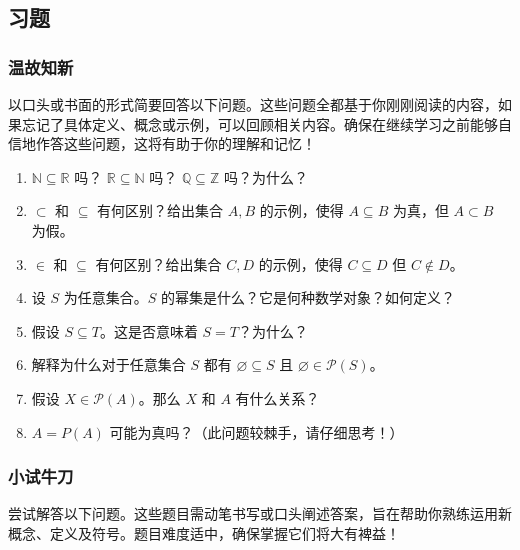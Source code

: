 \subsection{习题}

\subsubsection*{温故知新}

以口头或书面的形式简要回答以下问题。这些问题全都基于你刚刚阅读的内容，如果忘记了具体定义、概念或示例，可以回顾相关内容。确保在继续学习之前能够自信地作答这些问题，这将有助于你的理解和记忆！

\begin{enumerate}[label=(\arabic*)]
    \item $\mathbb{N} \subseteq \mathbb{R}$ 吗？ $\mathbb{R} \subseteq \mathbb{N}$ 吗？ $\mathbb{Q} \subseteq \mathbb{Z}$ 吗？为什么？
    \item $\subset$ 和 $\subseteq$ 有何区别？给出集合 $A, B$ 的示例，使得 $A \subseteq B$ 为真，但 $A \subset B$ 为假。
    \item $\in$ 和 $\subseteq$ 有何区别？给出集合 $C, D$ 的示例，使得 $C \subseteq D$ 但 $C \notin D$。
    \item 设 $S$ 为任意集合。$S$ 的幂集是什么？它是何种数学对象？如何定义？
    \item 假设 $S \subseteq T$。这是否意味着 $S = T$？为什么？
    \item 解释为什么对于任意集合 $S$ 都有 $\varnothing \subseteq S$ 且 $\varnothing \in \mathcal{P}(S)$。
    \item 假设 $X \in \mathcal{P}(A)$。那么 $X$ 和 $A$ 有什么关系？
    \item $A = P(A)$ 可能为真吗？（此问题较棘手，请仔细思考！）
\end{enumerate}

\subsubsection*{小试牛刀}

尝试解答以下问题。这些题目需动笔书写或口头阐述答案，旨在帮助你熟练运用新概念、定义及符号。题目难度适中，确保掌握它们将大有裨益！

